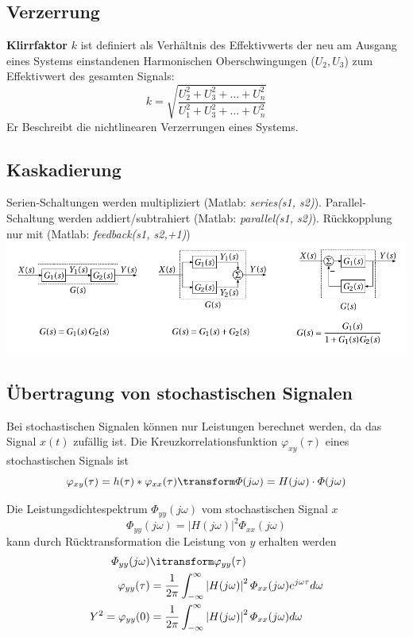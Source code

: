 \subsection{Verzerrung}
\textbf{Klirrfaktor} $k$ ist definiert als Verhältnis des Effektivwerts der neu am Ausgang eines Systems einstandenen Harmonischen Oberschwingungen ($U_2, U_3$) zum Effektivwert des gesamten Signals:
\[
k = \sqrt{\frac{U^2_2 + U^2_3 + \dots + U_n^2}{U^2_1 + U^2_3 + \dots + U_n^2}}
\]
Er Beschreibt die nichtlinearen Verzerrungen eines Systems.

\subsection{Kaskadierung}
Serien-Schaltungen werden multipliziert (Matlab: \textit{series(s1, s2)}). Parallel-Schaltung werden addiert/subtrahiert (Matlab: \textit{parallel(s1, s2)}). Rückkopplung nur mit (Matlab: \textit{feedback(s1, s2,+1)})
\includegraphics[width=\columnwidth]{Images/systeme}

\subsection{Übertragung von stochastischen Signalen}
Bei stochastischen Signalen können nur Leistungen berechnet werden, da das Signal $x(t)$ zufällig ist. Die Kreuzkorrelationsfunktion $\varphi_{xy}(\tau)$ eines stochastischen Signals ist
\[
\varphi_{xy}(\tau) = h(\tau)*\varphi_{xx}(\tau) \transform \varPhi(j\omega) = H(j\omega)\cdot\varPhi(j\omega)
\]

\noindent Die Leistungsdichtespektrum $\varPhi_{yy}(j\omega)$ vom stochastischen Signal $x$
\[
\varPhi_{yy}(j\omega) = \left|H(j\omega)\right|^2\varPhi_{xx}(j\omega)
\]
kann durch Rücktransformation die Leistung von $y$ erhalten werden
\begin{align*}
	\varPhi_{yy}(j\omega) &\itransform \varphi_{yy}(\tau) \\
	\varphi_{yy}(\tau) &= \frac{1}{2\pi}\int_{-\infty}^{\infty}\left|H(j\omega)\right|^2\varPhi_{xx}(j\omega)e^{j\omega\tau}d\omega\\
	Y^2 = \varphi_{yy}(0) &= \frac{1}{2\pi}\int_{-\infty}^{\infty}\left|H(j\omega)\right|^2\varPhi_{xx}(j\omega)d\omega
\end{align*}

